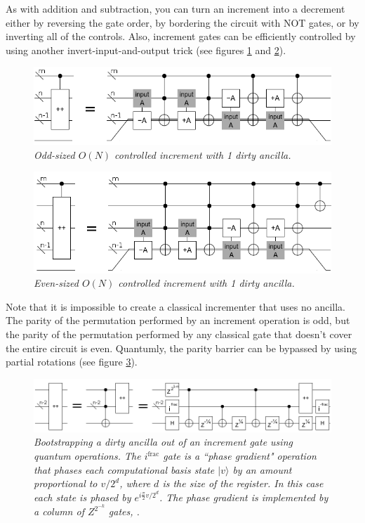 \documentclass[twocolumn]{article}
\begin{document}
As with addition and subtraction, you can turn an increment into a decrement either by reversing the gate order, by bordering the circuit with NOT gates, or by inverting all of the controls.
Also, increment gates can be efficiently controlled by using another invert-input-and-output trick (see figures \ref{fig:controlled-increment-odd} and \ref{fig:controlled-increment-even}).

\begin{figure}
  \centering
  \includegraphics[totalheight=2cm]{controlled-increment-odd.png}
  \caption{\em Odd-sized $O(N)$ controlled increment with 1 dirty ancilla.}
  \label{fig:controlled-increment-odd}
\end{figure}

\begin{figure}
  \centering
  \includegraphics[totalheight=2.5cm]{controlled-increment-even.png}
  \caption{\em Even-sized $O(N)$ controlled increment with 1 dirty ancilla.}
  \label{fig:controlled-increment-even}
\end{figure}

Note that it is impossible to create a classical incrementer that uses no ancilla.
The parity of the permutation performed by an increment operation is odd, but the parity of the permutation performed by any classical gate that doesn't cover the entire circuit is even.
Quantumly, the parity barrier can be bypassed by using partial rotations (see figure \ref{fig:bootstrap-ancilla}).

\begin{figure}
  \centering
  \includegraphics[totalheight=1.4cm]{ancilla-bootstrap.png}
  \caption{\em Bootstrapping a dirty ancilla out of an increment gate using quantum operations.
  The $i^{\text{frac}}$ gate is a ``phase gradient" operation that phases each computational basis state $|v\rangle$ by an amount proportional to $v/2^d$, where $d$ is the size of the register.
  In this case each state is phased by $e^{i \frac{\pi}{2} v/2^d}$.
  The phase gradient is implemented by a column of $Z^{2^{-k}}$ gates, .}
  \label{fig:bootstrap-ancilla}
\end{figure}
\end{document}
